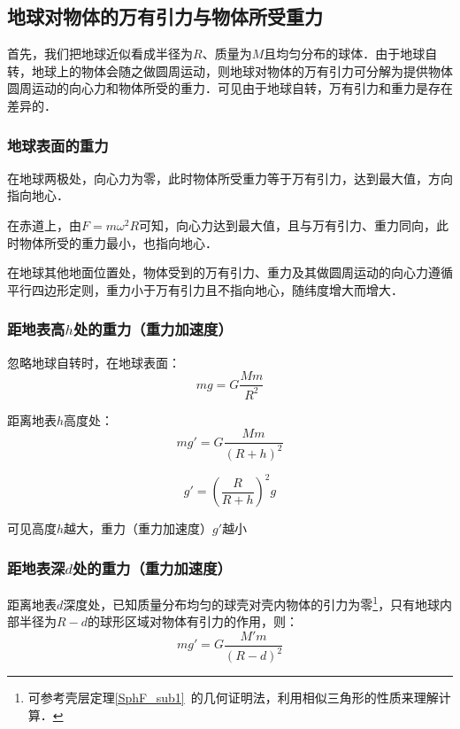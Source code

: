 \subsection{地球对物体的万有引力与物体所受重力}

首先，我们把地球近似看成半径为$R$、质量为$M$且均匀分布的球体．由于地球自转，地球上的物体会随之做圆周运动，则地球对物体的万有引力可分解为提供物体圆周运动的向心力和物体所受的重力．可见由于地球自转，万有引力和重力是存在差异的．

\subsubsection{地球表面的重力}

在地球两极处，向心力为零，此时物体所受重力等于万有引力，达到最大值，方向指向地心．

在赤道上，由$F=m\omega^2R$可知，向心力达到最大值，且与万有引力、重力同向，此时物体所受的重力最小，也指向地心．

在地球其他地面位置处，物体受到的万有引力、重力及其做圆周运动的向心力遵循平行四边形定则，重力小于万有引力且不指向地心，随纬度增大而增大．

\subsubsection{距地表高$h$处的重力（重力加速度）}

忽略地球自转时，在地球表面：
\begin{equation}\label{HSPM06_eq2}
mg=G\frac{Mm}{R^2}
\end{equation}

距离地表$h$高度处：
\begin{equation}
mg'=G\frac{Mm}{(R+h)^2}
\end{equation}

\begin{equation}
g'=(\frac{R}{R+h})^2g
\end{equation}

可见高度$h$越大，重力（重力加速度）$g'$越小

\subsubsection{距地表深$d$处的重力（重力加速度）}

距离地表$d$深度处，已知质量分布均匀的球壳对壳内物体的引力为零\footnote{可参考壳层定理\autoref{SphF_sub1}~的几何证明法，利用相似三角形的性质来理解计算．}，只有地球内部半径为$R-d$的球形区域对物体有引力的作用，则：
\begin{equation}\label{HSPM06_eq3}
mg'=G\frac{M'm}{(R-d)^2}
\end{equation}

